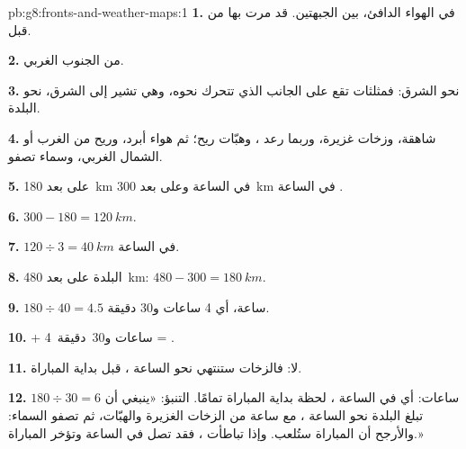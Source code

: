 \begin{solution}{pb:g8:fronts-and-weather-maps:1}
\textbf{1.} في الهواء الدافئ، بين الجبهتين.  قد
مرت بها من قبل.

\textbf{2.} من الجنوب الغربي.

\textbf{3.} نحو الشرق: فمثلثات  تقع على الجانب
الذي تتحرك نحوه، وهي تشير إلى الشرق، نحو البلدة.

\textbf{4.}  شاهقة، وزخات غزيرة، وربما رعد ،
وهبّات ريح؛ ثم هواء أبرد، وريح من الغرب أو الشمال الغربي،
وسماء تصفو.

\textbf{5.} على بعد \qty{180}{km} في الساعة  وعلى بعد \qty{300}{km} في الساعة .

\textbf{6.} $300 - 180 = \qty{120}{km}$.

\textbf{7.} $120 \div 3 = \qty{40}{km}$ في الساعة.

\textbf{8.} البلدة على بعد \qty{480}{km}: $480 - 300 = \qty{180}{km}$.

\textbf{9.} $180 \div 40 = 4.5$ ساعة، أي 4 ساعات و30 دقيقة.

\textbf{10.}  + 4~ساعات و30~دقيقة = \textbf{}.

\textbf{11.} لا: فالزخات ستنتهي نحو الساعة ، قبل
بداية المباراة.

\textbf{12.} $180 \div 30 = 6$ ساعات: أي في الساعة ، لحظة بداية المباراة تمامًا.
التنبؤ: «ينبغي أن تبلغ  البلدة نحو الساعة \textbf{}،
مع ساعة من الزخات الغزيرة والهبّات، ثم تصفو السماء: والأرجح أن المباراة
ستُلعب. وإذا تباطأت ، فقد تصل في الساعة  وتؤخر
المباراة.»
\end{solution}
